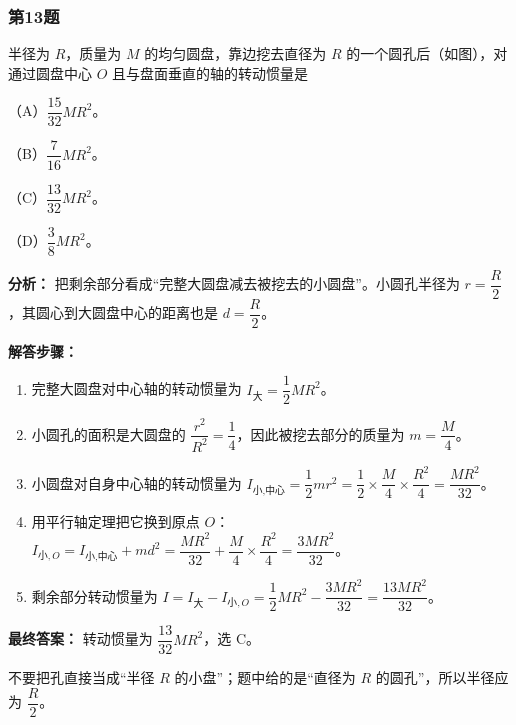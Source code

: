 \documentclass[12pt,a4paper]{ctexart}
\begin{document}
\subsubsection*{第13题}
\begin{tcolorbox}[colback=gray!2!white,colframe=black!60,title={题目}]
半径为 \(R\)，质量为 \(M\) 的均匀圆盘，靠边挖去直径为 \(R\) 的一个圆孔后（如图），对通过圆盘中心 \(O\) 且与盘面垂直的轴的转动惯量是\par
（A）\(\dfrac{15}{32}MR^2\)。\par
（B）\(\dfrac{7}{16}MR^2\)。\par
（C）\(\dfrac{13}{32}MR^2\)。\par
（D）\(\dfrac{3}{8}MR^2\)。\par
\end{tcolorbox}
\begin{tcolorbox}[colback=blue!2!white,colframe=blue!55!black,title={完整答案}]
\textbf{分析：}
把剩余部分看成“完整大圆盘减去被挖去的小圆盘”。小圆孔半径为 \(r=\dfrac{R}{2}\)，其圆心到大圆盘中心的距离也是 \(d=\dfrac{R}{2}\)。\par
\textbf{解答步骤：}
\begin{enumerate}
\item 完整大圆盘对中心轴的转动惯量为 \(I_{\text{大}}=\dfrac12 MR^2\)。
\item 小圆孔的面积是大圆盘的 \(\dfrac{r^2}{R^2}=\dfrac14\)，因此被挖去部分的质量为 \(m=\dfrac{M}{4}\)。
\item 小圆盘对自身中心轴的转动惯量为 \(I_{\text{小,中心}}=\dfrac12 mr^2=\dfrac12\times \dfrac{M}{4}\times \dfrac{R^2}{4}=\dfrac{MR^2}{32}\)。
\item 用平行轴定理把它换到原点 \(O\)：\(I_{\text{小},O}=I_{\text{小,中心}}+md^2=\dfrac{MR^2}{32}+\dfrac{M}{4}\times \dfrac{R^2}{4}=\dfrac{3MR^2}{32}\)。
\item 剩余部分转动惯量为 \(I=I_{\text{大}}-I_{\text{小},O}=\dfrac12 MR^2-\dfrac{3MR^2}{32}=\dfrac{13MR^2}{32}\)。
\end{enumerate}
\textbf{最终答案：}
转动惯量为 \(\dfrac{13}{32}MR^2\)，选 C。\par
\end{tcolorbox}
\begin{tcolorbox}[colback=red!2!white,colframe=red!55!black,title={易错点}]
不要把孔直接当成“半径 \(R\) 的小盘”；题中给的是“直径为 \(R\) 的圆孔”，所以半径应为 \(\dfrac{R}{2}\)。\par
\end{tcolorbox}
\end{document}
